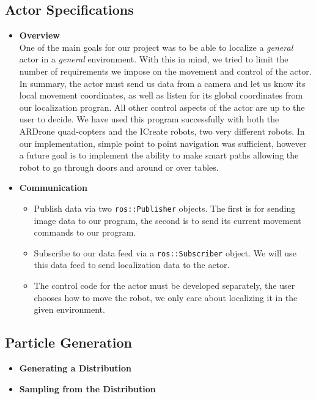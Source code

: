 \documentclass[a4paper,11pt]{article}
\begin{document}
 \subsection{Actor Specifications}
\begin{itemize}
\item \textbf{Overview} \\
One of the main goals for our project was to be able to localize a \emph{general} actor in a \emph{general} environment. With this in mind, we tried to limit the number of requirements we impose on the movement and control of the actor. In summary, the actor must send us data from a camera and let us know its local movement coordinates, as well as listen for its global coordinates from our localization progran. All other control aspects of the actor are up to the user to decide. We have used this program successfully with both the ARDrone quad-copters and the ICreate robots, two very different robots. In our implementation, simple point to point navigation was sufficient, however a future goal is to implement the ability to make smart paths allowing the robot to go through doors and around or over tables.

\item \textbf{Communication} \\
  \begin{itemize}
  \item Publish data via two \texttt{ros::Publisher} objects. The first is for sending image data to our program, the second is to send its current movement commands to our program. 
  \item Subscribe to our data feed via a \texttt{ros::Subscriber} object. We will use this data feed to send localization data to the actor.
  \item The control code for the actor must be developed separately, the user chooses how to move the robot, we only care about localizing it in the given environment.
  \end{itemize} 
\end{itemize}

\subsection{Particle Generation}
\begin{itemize}
  \item \textbf{Generating a Distribution}
  \item \textbf{Sampling from the Distribution}
\end{itemize}
\end{document}
